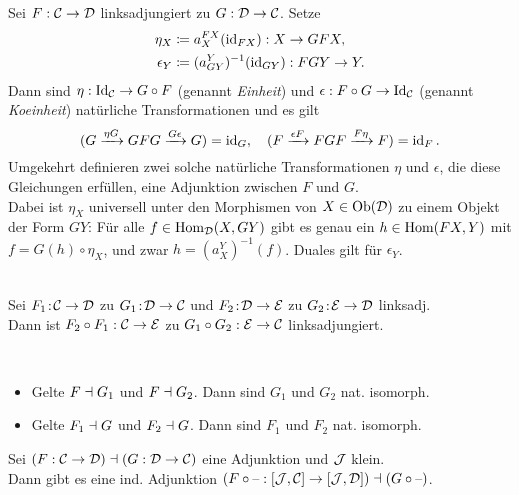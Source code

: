 \documentclass{cheat-sheet}
\begin{document}
\begin{bem}
  Sei $F : \mathcal{C} \to \mathcal{D}$ linksadjungiert zu $G : \mathcal{D} \to \mathcal{C}$. Setze
  \begin{align*}
    \eta_X & \coloneqq a_X^{FX}(\operatorname{id}_{FX}) : X \to GFX, \\
    \epsilon_Y & \coloneqq (a_{GY}^Y)^{-1}(\operatorname{id}_{GY}) : FGY \to Y.
  \end{align*}
  Dann sind $\eta : \operatorname{Id}_{\mathcal{C}} \to G \circ F$ (genannt \emph{Einheit}) und $\epsilon : F \circ G \to \operatorname{Id}_{\mathcal{C}}$ (genannt \emph{Koeinheit}) natürliche Transformationen und es gilt
  \[
    (G \xrightarrow{\eta G} GFG \xrightarrow{G \epsilon} G) = \operatorname{id}_G, \quad
    (F \xrightarrow{\epsilon F} FGF \xrightarrow{F \eta} F) = \operatorname{id}_F.
  \]
  Umgekehrt definieren zwei solche natürliche Transformationen $\eta$ und $\epsilon$, die diese Gleichungen erfüllen, eine Adjunktion zwischen $F$ und $G$. \\
  Dabei ist $\eta_X$ universell unter den Morphismen von $X \in \operatorname{Ob}(\mathcal{D})$ zu einem Objekt der Form $GY$:
  Für alle $f \in \operatorname{Hom}_{\mathcal{D}}(X, GY)$ gibt es genau ein $h \in \operatorname{Hom}(FX, Y)$ mit $f = G(h) \circ \eta_X$, und zwar $h = (a_X^Y)^{-1}(f)$. Duales gilt für $\epsilon_Y$.
\end{bem}

\begin{lem}\mbox{}\\
  Sei $F_1 \!:\! \mathcal{C} \to \mathcal{D}$ zu $G_1 \!:\! \mathcal{D} \to \mathcal{C}$ und $F_2 \!:\! \mathcal{D} \to \mathcal{E}$ zu $G_2 \!:\! \mathcal{E} \to \mathcal{D}$ linksadj. \\
  Dann ist $F_2 \circ F_1 : \mathcal{C} \to \mathcal{E}$ zu $G_1 \circ G_2 : \mathcal{E} \to \mathcal{C}$ linksadjungiert.
\end{lem}

\begin{lem}\mbox{}\\
  \begin{itemize}
    \item Gelte $F \dashv G_1$ und $F \dashv G_2$. Dann sind $G_1$ und $G_2$ nat. isomorph.
    \item Gelte $F_1 \dashv G$ und $F_2 \dashv G$. Dann sind $F_1$ und $F_2$ nat. isomorph.
  \end{itemize}
\end{lem}

\begin{bem}
  Sei $(F : \mathcal{C} \to \mathcal{D}) \dashv (G : \mathcal{D} \to \mathcal{C})$ eine Adjunktion und $\mathcal{J}$ klein. \\
  Dann gibt es eine ind. Adjunktion $(F \circ \text{--} : [\mathcal{J}, \mathcal{C}] \to [\mathcal{J}, \mathcal{D}]) \dashv (G \circ \text{--})$.
\end{bem}
\end{document}
